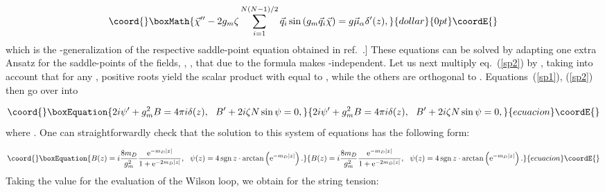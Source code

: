 \documentclass[a4paper,12pt]{article}
\begin{document}
$$\coord{}\boxMath{\vec\chi''-2g_m\zeta\sum\limits_{i=1}^{N(N-1)/2}\vec q_i\sin\left(g_m\vec q_i\vec\chi\right)=g\vec\mu_\alpha
\delta'(z),}{dollar}{0pt}\coordE{}$$
which is the \coordHE{}-generalization of the respective saddle-point equation obtained in ref.~\cite{polpl}.]
These equations can be solved by adapting one extra Ansatz for the saddle-points of the fields,
\coordHE{}, \coordHE{}, that due to the formula \coordHE{}
makes \coordHE{}  \myHighlight{$\alpha$}\coordHE{}-independent. Let us next multiply eq.~(\ref{sp2}) by \myHighlight{$\vec\mu_\alpha$}\coordHE{}, taking into account that
for any \myHighlight{$\alpha$}\coordHE{}, \coordHE{} positive roots yield the scalar product with \myHighlight{$\vec\mu_\alpha$}\coordHE{} equal to \coordHE{}, while the others are
orthogonal to \myHighlight{$\vec\mu_\alpha$}\coordHE{}. Equations~(\ref{sp1}), (\ref{sp2}) then go over into

\begin{equation}\coord{}\boxEquation{
\label{SP}
2i\psi'+g_m^2B=4\pi i\delta(z),~~ B'+2i\zeta N\sin\psi=0,
}{
2i\psi'+g_m^2B=4\pi i\delta(z),~~ B'+2i\zeta N\sin\psi=0,
}{ecuacion}\coordE{}\end{equation}
where \coordHE{}. One can straightforwardly check that the solution to this system of equations has the following form:

\begin{equation}\coord{}\boxEquation{
\label{solution}
B(z)=i\frac{8m_D}{g_m^2}\frac{{\rm e}^{-m_D|z|}}{1+{\rm e}^{-2m_D|z|}},~~
\psi(z)=4{\,}{\rm sgn}{\,}z\cdot\arctan\left({\rm e}^{-m_D|z|}\right).
}{
B(z)=i\frac{8m_D}{g_m^2}\frac{{\rm e}^{-m_D|z|}}{1+{\rm e}^{-2m_D|z|}},~~
\psi(z)=4{\,}{\rm sgn}{\,}z\cdot\arctan\left({\rm e}^{-m_D|z|}\right).
}{ecuacion}\coordE{}\end{equation}
Taking the value \coordHE{} for the evaluation of the Wilson loop, we obtain for the string tension:
\end{document}
